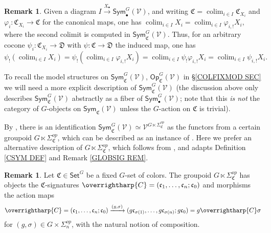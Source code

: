 \documentclass[a4paper,10pt
 ,final
]{article}%
\numberwithin{equation}{section}
\numberwithin{figure}{section}
\theoremstyle{definition} %
\newtheorem{remark}[equation]{Remark}%
\newcommand{\vect}[1]{\text{\overrightharp{\ensuremath{#1}}}}
\DeclareMathOperator{\colim}{colim}%
\newcommand{\V}{\ensuremath{\mathcal V}}
\newcommand{\1}{\ensuremath{\mathbbm 1}}%
\begin{document}
\begin{remark}
	Given a diagram
	$I \xrightarrow{X_{\bullet}} 
	\mathsf{Sym}_{\bullet}^G(\V)$,
	and writing
	$\mathfrak{C} = \colim_{i \in I} \mathfrak{C}_{X_i}$
	and 
	$\varphi_i \colon \mathfrak{C}_{X_i} \to \mathfrak{C}$
	for the canonical maps,
	one has
	$	
	\colim_{i \in I} X_i = 
	\colim_{i \in I} \varphi_{i,!} X_i,
	$	
	where the second colimit is computed in 
	$\mathsf{Sym}_{\mathfrak{C}}^G(\V)$.
	Thus, for an arbitrary cocone
	$\psi_i \colon \mathfrak{C}_{X_i} \to \mathfrak{D}$
	with  
	$\psi \colon \mathfrak{C} \to \mathfrak{D}$ the induced map, one has
	\begin{equation}\label{LIMINFIBSUP EQ}
	\psi_!\left(\colim_{i \in I} X_i\right) 
	= 
	\psi_!
	\left(\colim_{i \in I} \varphi_{i,!} X_i\right)
	=
	\colim_{i \in I} \psi_! \varphi_{i,!} X_i
	=
	\colim_{i \in I} \psi_{i,!} X_i.
	\end{equation}
\end{remark}


To recall the model structures on 
$\mathsf{Sym}^G_{\mathfrak{C}}(\V)$,
$\mathsf{Op}^G_{\mathfrak{C}}(\V)$
in \S \ref{COLFIXMOD SEC}
we will need a more explicit description of 
$\mathsf{Sym}^G_{\mathfrak{C}}(\V)$
(the discussion above
only describes $\mathsf{Sym}^G_{\mathfrak{C}}(\V)$
abstractly as a fiber of $\mathsf{Sym}^G_{\bullet}(\V)$;
note that this 
\emph{is not} the category 
of $G$-objects on $\mathsf{Sym}_{\mathfrak{C}}(\V)$
unless the $G$-action on $\mathfrak{C}$
is trivial).


By \cite[Prop. \ref{OC-EQUIVFNCON PROP}]{BP_FCOP},
there is an identification 
$\mathsf{Sym}^G_{\mathfrak{C}}(\mathcal{V}) 
\simeq 
\V^{G \ltimes \Sigma^{op}_{\mathfrak{C}}}$
as the functors from a certain groupoid
$G \ltimes \Sigma^{op}_{\mathfrak{C}}$,
which can be described as an instance of
\cite[Ex. \ref{OC-GLTIMES EQ}]{BP_FCOP}.
Here we prefer an alternative description
of $G \ltimes \Sigma^{op}_{\mathfrak{C}}$,
which follows from 
\cite[Rem. \ref{OC-SIGACT REM}]{BP_FCOP},
and adapts Definition \ref{CSYM DEF} and
Remark \ref{GLOBSIG REM}.



\begin{remark}\label{GLTIMESSIG REM}
	Let $\mathfrak {C} \in \mathsf{Set}^G$ be a fixed $G$-set of colors.
	The groupoid $G \ltimes \Sigma^{op}_{\mathfrak{C}}$
	has objects the $\mathfrak {C}$-signatures
	$\vect C = (\mathfrak c_1, \dots, \mathfrak c_n; \mathfrak c_0)$
	and morphisms the action maps
	\begin{equation}\label{CSYMG EQ}
	\vect{C} =
	(\mathfrak c_1, \dots, \mathfrak c_n; \mathfrak c_0) \xrightarrow{(g,\sigma)} 
	(g \mathfrak c_{\sigma(1)}, \dots, 
	g \mathfrak c_{\sigma(n)}; 
	g \mathfrak c_0)
	= g \vect{C} \sigma
	\end{equation}
	for $(g,\sigma) \in G \times \Sigma_n^{op}$,
	with the natural notion of composition.
\end{remark}
\end{document}
